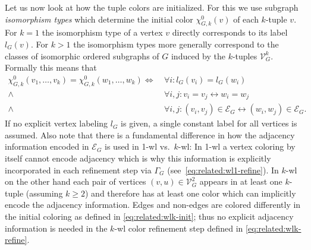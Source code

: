Let us now look at how the tuple colors are initialized.
For this we use subgraph \textit{isomorphism types} which determine the initial color $\chi_{G,k}^0(v)$ of each $k$-tuple $v$.
For $k = 1$ the isomorphism type of a vertex $v$ directly corresponds to its label $l_G(v)$.
For $k > 1$ the isomorphism types more generally correspond to the classes of isomorphic ordered subgraphs of $G$ induced by the $k$-tuples $\mathcal{V}_G^k$.
Formally this means that
\begin{align}
	\chi_{G,k}^0(v_1, \dots, v_k) = \chi_{G,k}^0(w_1, \dots, w_k) \label{eq:related:wlk-init}
	\iff &\ \forall i: l_G(v_i) = l_G(w_i) \\
	\land &\ \forall i, j: v_i = v_j \leftrightarrow w_i = w_j \nonumber \\
	\land &\ \forall i, j: (v_i, v_j) \in \mathcal{E}_G \leftrightarrow (w_i, w_j) \in \mathcal{E}_G \text{.} \nonumber
\end{align}
If no explicit vertex labeling $l_G$ is given, a single constant label for all vertices is assumed.
Also note that there is a fundamental difference in how the adjacency information encoded in $\mathcal{E}_G$ is used in 1-\acs{wl} vs.\ $k$-\acs{wl}:
In 1-\acs{wl} a vertex coloring by itself cannot encode adjacency which is why this information is explicitly incorporated in each refinement step via $\Gamma_G$ (see~\cref{eq:related:wl1-refine}).
In $k$-\acs{wl} on the other hand each pair of vertices $(v, u) \in \mathcal{V}_G^2$ appears in at least one $k$-tuple (assuming $k \geq 2$) and therefore has at least one color which can implicitly encode the adjacency information.
Edges and non-edges are colored differently in the initial coloring as defined in \cref{eq:related:wlk-init};
thus no explicit adjacency information is needed in the $k$-\acs{wl} color refinement step defined in \cref{eq:related:wlk-refine}.

